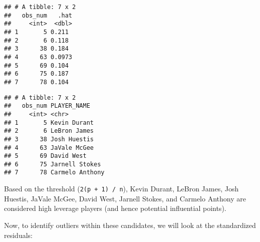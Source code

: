 \documentclass[]{article}
\newenvironment{Shaded}{\begin{snugshade}}{\end{snugshade}}
\newcommand{\DataTypeTok}[1]{\textcolor[rgb]{0.13,0.29,0.53}{#1}}
\newcommand{\DecValTok}[1]{\textcolor[rgb]{0.00,0.00,0.81}{#1}}
\newcommand{\KeywordTok}[1]{\textcolor[rgb]{0.13,0.29,0.53}{\textbf{#1}}}
\newcommand{\NormalTok}[1]{#1}
\newcommand{\OperatorTok}[1]{\textcolor[rgb]{0.81,0.36,0.00}{\textbf{#1}}}
\newcommand{\StringTok}[1]{\textcolor[rgb]{0.31,0.60,0.02}{#1}}
\begin{document}
\begin{verbatim}
## # A tibble: 7 x 2
##   obs_num   .hat
##     <int>  <dbl>
## 1       5 0.211 
## 2       6 0.118 
## 3      38 0.184 
## 4      63 0.0973
## 5      69 0.104 
## 6      75 0.187 
## 7      78 0.104
\end{verbatim}

\begin{Shaded}
\end{Shaded}

\begin{verbatim}
## # A tibble: 7 x 2
##   obs_num PLAYER_NAME    
##     <int> <chr>          
## 1       5 Kevin Durant   
## 2       6 LeBron James   
## 3      38 Josh Huestis   
## 4      63 JaVale McGee   
## 5      69 David West     
## 6      75 Jarnell Stokes 
## 7      78 Carmelo Anthony
\end{verbatim}

Based on the threshold (\texttt{2(p\ +\ 1)\ /\ n}), Kevin Durant, LeBron
James, Josh Huestis, JaVale McGee, David West, Jarnell Stokes, and
Carmelo Anthony are considered high leverage players (and hence
potential influential points).

Now, to identify outliers within these candidates, we will look at the
standardized residuals:
\end{document}

